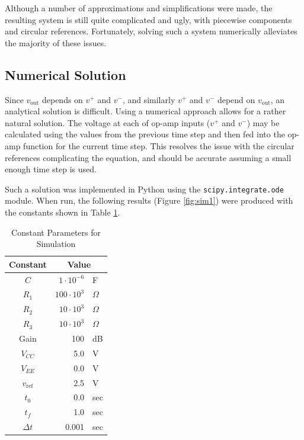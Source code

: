 \documentclass[12pt]{article}
\begin{document}
Although a number of approximations and simplifications were made, the resulting system is still quite complicated and ugly, with piecewise components and circular references. Fortunately, solving such a system numerically alleviates the majority of these issues.

\subsection{Numerical Solution}
Since $v_\text{out}$ depends on $v^+$ and $v^-$, and similarly $v^+$ and $v^-$ depend on $v_\text{out}$, an analytical solution is difficult. Using a numerical approach allows for a rather natural solution. The voltage at each of op-amp inputs ($v^+$ and $v^-$) may be calculated using the values from the previous time step and then fed into the op-amp function for the current time step. This resolves the issue with the circular references complicating the equation, and should be accurate assuming a small enough time step is used.\par 
Such a solution was implemented in Python using the \texttt{scipy.integrate.ode} module. When run, the following results (Figure \ref{fig:sim1}) were produced with the constants shown in Table \ref{tab:consts}.

\begin{spreadlines}{1ex}
\begin{table}[h!]
    \centering
    \caption{Constant Parameters for Simulation}\vspace{2mm}
    \begin{tabular}{c|rl}
    Constant &  \multicolumn{2}{c}{Value}\\
    \hline
    $C$         &   $1\cdot10^{-6}$     & F\\
    $R_1$       &   $100\cdot10^3$      & $\Omega$\\
    $R_2$       &   $10\cdot10^3$       & $\Omega$\\
    $R_3$       &   $10\cdot10^3$       & $\Omega$\\
    Gain        &   100                 & dB\\
    $V_{CC}$    &   5.0                 & V\\
    $V_{EE}$    &   0.0                 & V\\
    $v_\text{ref}$ & 2.5                & V\\
    $t_0$       &   0.0                 & sec\\
    $t_f$       &   1.0                 & sec\\
    $\Delta t$  &   0.001               & sec
    \end{tabular}
    \label{tab:consts}
\end{table}
\end{spreadlines}
\end{document}
